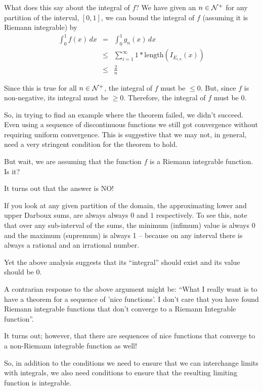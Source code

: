 \documentclass{article}
\begin{document}
What does this say about the integral of $f$? 
We have given an $n \in {\cal N}^+$ for any partition of the interval, $[0,1]$, we can bound the integral of $f$ 
(assuming it is Riemann integrable) by
\begin{eqnarray*}
	\int_0^1 f(x) \, dx & =   & \int_0^1 g_{n}(x) \, dx \\
						& \le & \sum_{i=1}^\infty 1 * \text{length}(I_{E_{i,n}}(x)) \\
						& \le & \frac{2}{n}
\end{eqnarray*}

Since this is true for all $n \in {\cal N}^+$, the integral of $f$ must be $\le 0$. 
But, since $f$ is non-negative, its integral must be $\ge 0$. Therefore, the 
integral of $f$ must be $0$.

So, in trying to find an example where the theorem failed, we didn't succeed. 
Even using a sequence of discontinuous functions we still got convergence without 
requiring uniform convergence. This is suggestive that we may not, in general, 
need a very stringent condition for the theorem to hold.

But wait, we are assuming that the function $f$ is a Riemann integrable function. 
Is it?

It turns out that the answer is NO! 

If you look at any given partition of the domain, the approximating lower 
and upper Darboux sums, are always 
always $0$ and $1$ respectively. To see this, note that 
over any sub-interval of the sums, the minimum (infimum) value is always 0 and 
the maximum (supremum) is always 1 -- because on any interval there is always a 
rational and an irrational number.

Yet the above analysis suggests that its ``integral'' should exist and its value 
should be $0$.

A contrarian response to the above argument might be:
``What I really want is to have a theorem for a sequence of 
'nice functions'. I don't care that you have found Riemann integrable functions that
don't converge to a Riemann Integrable function''. 

It turns out; however, that there are sequences of nice functions that converge 
to a non-Riemann integrable function as well!

So, in addition to the conditions we need to ensure that we can interchange 
limits with integrals, we also need conditions to ensure that the 
resulting limiting function is integrable.
\end{document}
